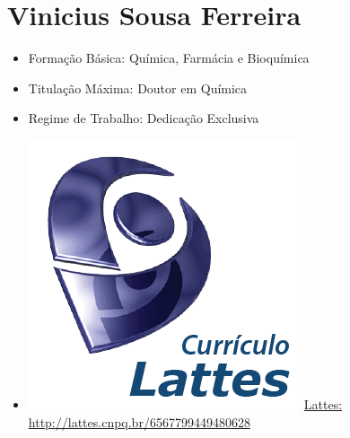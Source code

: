 \documentclass[11pt,fleqn]{book} %
\begin{document}
\section{Vinicius Sousa Ferreira}\label{ViniciusFerreira}
\begin{itemize}
	\item Formação Básica: Química, Farmácia e Bioquímica
	\item Titulação Máxima: Doutor em Química
	\item Regime de Trabalho: Dedicação Exclusiva
	\item \includegraphics[scale=.03]{Pictures/lattes}~\href{http://lattes.cnpq.br/6567799449480628}{Lattes: http://lattes.cnpq.br/6567799449480628}
\end{itemize}
\end{document}

